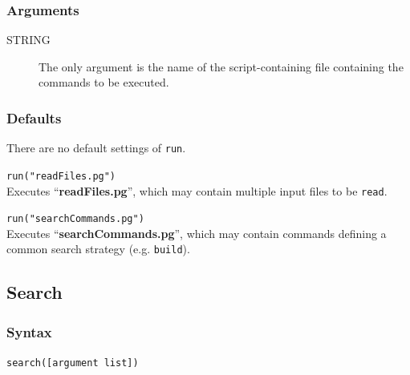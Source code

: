 	\subsubsection{Arguments}
	\begin{description} 
		
		\item[STRING] The only argument is the name of the script-containing file
		 containing the commands to be executed.
		 
	\end{description}
		
	\subsubsection{Defaults}
		There are no default settings of \texttt{run}. 
	
	\begin{example}
	
		\item{\texttt{run("readFiles.pg")}\\ Executes ``\textbf{readFiles.pg}'', which 
		may contain multiple input files to be \texttt{read}.}
		
		\item{\texttt{run("searchCommands.pg")}\\ Executes ``\textbf{searchCommands.pg}'', 
		which may contain commands defining a common search strategy (e.g. 
		\texttt{build}).}
		
	\end{example}

\subsection{Search}
\label{subsec:search}
	\subsubsection{Syntax}
		\texttt{search([argument list])}
	
